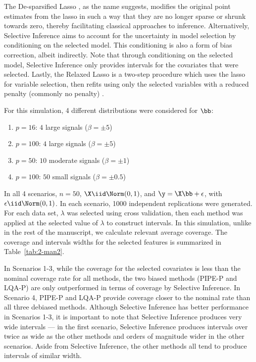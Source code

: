The De-sparsified Lasso \citep{ZhangZhang2014}, as the name suggests, modifies the original point estimates from the lasso in such a way that they are no longer sparse or shrunk towards zero, thereby facilitating classical approaches to inference. Alternatively, Selective Inference \citep{Lee2016,Tibshirani2016} aims to account for the uncertainty in model selection by conditioning on the selected model. This conditioning is also a form of bias correction, albeit indirectly. Note that through conditioning on the selected model, Selective Inference only provides intervals for the covariates that were selected. Lastly, the Relaxed Lasso is a two-step procedure which uses the lasso for variable selection, then refits using only the selected variables with a reduced penalty (commonly no penalty) \citep{Meinshausen2007}.

For this simulation, 4 different distributions were considered for $\bb$:
\begin{enumerate}
  \item $p = 16$: $4$ large signals ($\beta = \pm 5$)
  \item $p = 100$: $4$ large signals ($\beta = \pm 5$)
  \item $p = 50$: $10$ moderate signals ($\beta = \pm 1$)
  \item $p = 100$: $50$ small signals ($\beta = \pm 0.5$)
\end{enumerate}

\noindent In all 4 scenarios, $n = 50$, $\X \iid \Norm(0,1)$, and $\y = \X\bb + \epsilon$, with $\epsilon \iid \Norm(0, 1)$. In each scenario, 1000 independent replications were generated. For each data set, $\lambda$ was selected using cross validation, then each method was applied at the selected value of $\lambda$ to construct intervals. In this simulation, unlike in the rest of the manuscript, we calculate relevant average coverage. The coverage and intervals widths for the selected features is summarized in Table~\ref{tab:2-man2}.

\begin{table}[hbt!]
  \centering
  
  \caption{\label{tab:2-man2} Relevant average coverage (average coverage for features with non-zero lasso estimates) and median widths for two biased interval construction methods (PIPE-P and LQA-P) compared to three debiased methods across 4 set ups described in Section~\ref{sec:biased-intervals}.}
\end{table}

In Scenarios 1-3, while the coverage for the selected covariates is less than the nominal coverage rate for all methods, the two biased methods (PIPE-P and LQA-P) are only outperformed in terms of coverage by Selective Inference. In Scenario 4, PIPE-P and LQA-P provide coverage closer to the nominal rate than all three debiased methods. Although Selective Inference has better performance in Scenarios 1-3, it is important to note that Selective Inference produces very wide intervals --- in the first scenario, Selective Inference produces intervals over twice as wide as the other methods and orders of magnitude wider in the other scenarios. Aside from Selective Inference, the other methods all tend to produce intervals of similar width.


